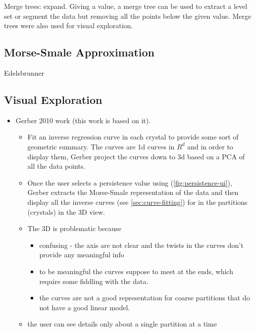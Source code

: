 Merge trees: expand. Giving a value, a merge tree can be used to extract a level set or segment the data but removing all the points below the given value. Merge trees were also used for visual exploration.

\subsection{Morse-Smale Approximation}
\label{sec:morse-smale}
Edelsbrunner~\cite{Edelsbrunner03}


\subsection{Visual Exploration}
\label{sec:hd-exploration}

\begin{itemize}
    \item Gerber 2010 work (this work is based on it). 
    \begin{itemize}
        \item Fit an inverse regression curve in each crystal to provide some sort of geometric summary. The curves are 1d curves in $R^d$ and in order to display them, Gerber project the curves down to 3d based on a PCA of all the data points.
        
        \item Once the user selects a persistence value using (\autoref{fig:persistence-ui}),  Gerber extracts the Morse-Smale representation of the data and then display all the inverse curves (see \autoref{sec:curve-fitting}) for in the partitions (crystals) in the 3D view.
        
        \item The 3D is problematic because 
            \begin{itemize}
                \item confusing - the axis are not clear and the twists in the curves don't provide any meaningful info
                \item to be meaningful the curves suppose to meet at the ends, which require some fiddling with the data. 
                \item the curves are not a good representation for coarse partitions that do not have a good linear model. 
            \end{itemize}
        
        \item the user can see details only about a single partition at a time
        

\end{itemize}
\end{itemize}
